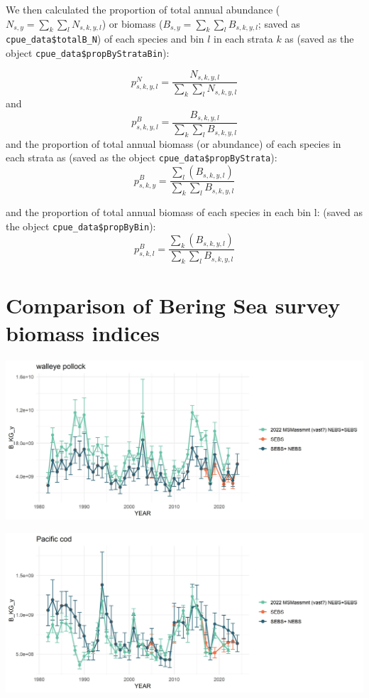\documentclass[
]{article}
\begin{document}
We then calculated the proportion of total annual abundance
(\(N_{s,y}= \sum_k{\sum_l{N_{s,k,y,l}}}\)) or biomass
(\(B_{s,y}= \sum_k{\sum_l{B_{s,k,y,l}}}\); saved as
\texttt{cpue\_data\$totalB\_N}) of each species and bin \(l\) in each
strata \(k\) as (saved as the object
\texttt{cpue\_data\$propByStrataBin}):

\[p^N_{s,k,y,l} = \frac{N_{s,k,y,l}}{ \sum_k{\sum_l{N_{s,k,y,l}}}}\] and
\[p^B_{s,k,y,l} = \frac{B_{s,k,y,l}}{ \sum_k{\sum_l{B_{s,k,y,l}}}}\] and
the proportion of total annual biomass (or abundance) of each species in
each strata as (saved as the object \texttt{cpue\_data\$propByStrata}):
\[p^B_{s,k,y} = \frac{\sum_l({B_{s,k,y,l}})}{ \sum_k{\sum_l{B_{s,k,y,l}}}}\]

and the proportion of total annual biomass of each species in each bin
l: (saved as the object \texttt{cpue\_data\$propByBin}):
\[p^B_{s,k,l} = \frac{\sum_k({B_{s,k,y,l}})}{ \sum_k{\sum_l{B_{s,k,y,l}}}}\]

\hypertarget{comparison-of-bering-sea-survey-biomass-indices}{%
\section{Comparison of Bering Sea survey biomass
indices}\label{comparison-of-bering-sea-survey-biomass-indices}}

\includegraphics{figs/plk_srvy.jpg}

\includegraphics{figs/pcod_srvy.jpg}
\end{document}
